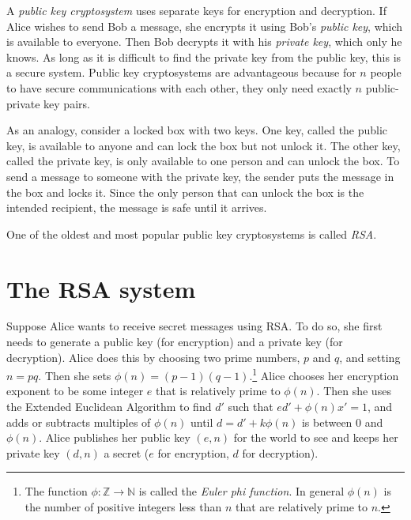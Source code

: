 \label{lab:RSA}


A \emph{public key cryptosystem} uses separate keys for encryption and decryption.
If Alice wishes to send Bob a message, she encrypts it using Bob's \emph{public key}, which is available to everyone.
Then Bob decrypts it with his \emph{private key}, which only he knows.
As long as it is difficult to find the private key from the public key, this is a secure system.
Public key cryptosystems are advantageous because for $n$ people to have secure communications with each other, they only need exactly $n$ public-private key pairs.

As an analogy, consider a locked box with two keys.
One key, called the public key, is available to anyone and can lock the box but not unlock it.
The other key, called the private key, is only available to one person and can unlock the box.
To send a message to someone with the private key, the sender puts the message in the box and locks it.
Since the only person that can unlock the box is the intended recipient, the message is safe until it arrives.

One of the oldest and most popular public key cryptosystems is called \emph{RSA}.

\section*{The RSA system}
Suppose Alice wants to receive secret messages using RSA.
To do so, she first needs to generate a public key (for encryption) and a private key (for decryption).
Alice does this by choosing two prime numbers, $p$ and $q$, and setting $n=pq$.
Then she sets $\phi(n) = (p-1)(q-1)$.\footnote{
The function $\phi: \mathbb{Z} \rightarrow \mathbb{N}$ is called the \emph{Euler phi function}. In general $\phi(n)$ is the number of positive integers less than $n$ that are relatively prime to $n$.}
Alice chooses her encryption exponent to be some integer $e$ that is relatively prime to $\phi(n)$.
Then she uses the Extended Euclidean Algorithm to find $d'$ such that $ed' + \phi(n)x' = 1$, and adds or subtracts multiples of $\phi(n)$ until $d = d'+k\phi(n)$ is between 0 and $\phi(n)$.
Alice publishes her public key $(e, n)$ for the world to see and keeps her private key $(d,n)$ a secret ($e$ for encryption, $d$ for decryption).

